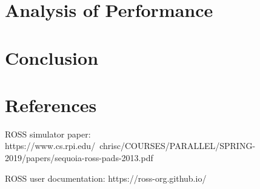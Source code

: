 \documentclass[10pt]{article}
\begin{document}
\begin{multicols}{2}
\section{Analysis of Performance}

\section{Conclusion}

\section{References}

ROSS simulator paper: https://www.cs.rpi.edu/~chrisc/COURSES/PARALLEL/SPRING-2019/papers/sequoia-ross-pads-2013.pdf

ROSS user documentation: https://ross-org.github.io/

\end{multicols}
\end{document}
